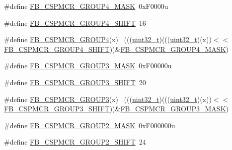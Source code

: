 \begin{DoxyCompactItemize}
\item 
\#define \hyperlink{group___f_b___register___masks_gaa24d34ff345a0131f93f71c38e20b7a5}{F\+B\+\_\+\+C\+S\+P\+M\+C\+R\+\_\+\+G\+R\+O\+U\+P4\+\_\+\+M\+A\+SK}~0x\+F0000u
\item 
\#define \hyperlink{group___f_b___register___masks_ga53fde1abc71ae9149418ea7fb6e53fba}{F\+B\+\_\+\+C\+S\+P\+M\+C\+R\+\_\+\+G\+R\+O\+U\+P4\+\_\+\+S\+H\+I\+FT}~16
\item 
\#define \hyperlink{group___f_b___register___masks_gab06572d35c1e04d27ba4eaebe576ac07}{F\+B\+\_\+\+C\+S\+P\+M\+C\+R\+\_\+\+G\+R\+O\+U\+P4}(x)                                        ~(((\hyperlink{_p_e___types_8h_a33594304e786b158f3fb30289278f5af}{uint32\+\_\+t})(((\hyperlink{_p_e___types_8h_a33594304e786b158f3fb30289278f5af}{uint32\+\_\+t})(x))$<$$<$\hyperlink{group___f_b___register___masks_ga53fde1abc71ae9149418ea7fb6e53fba}{F\+B\+\_\+\+C\+S\+P\+M\+C\+R\+\_\+\+G\+R\+O\+U\+P4\+\_\+\+S\+H\+I\+FT}))\&\hyperlink{group___f_b___register___masks_gaa24d34ff345a0131f93f71c38e20b7a5}{F\+B\+\_\+\+C\+S\+P\+M\+C\+R\+\_\+\+G\+R\+O\+U\+P4\+\_\+\+M\+A\+SK})
\item 
\#define \hyperlink{group___f_b___register___masks_gac53d0fcbc3464725ceda1d20147fe98c}{F\+B\+\_\+\+C\+S\+P\+M\+C\+R\+\_\+\+G\+R\+O\+U\+P3\+\_\+\+M\+A\+SK}~0x\+F00000u
\item 
\#define \hyperlink{group___f_b___register___masks_ga9f0b849b6cb1a2f629dcd23a0a0a4306}{F\+B\+\_\+\+C\+S\+P\+M\+C\+R\+\_\+\+G\+R\+O\+U\+P3\+\_\+\+S\+H\+I\+FT}~20
\item 
\#define \hyperlink{group___f_b___register___masks_gadf0a03bd6ac07968aaa35ad4f6fecfeb}{F\+B\+\_\+\+C\+S\+P\+M\+C\+R\+\_\+\+G\+R\+O\+U\+P3}(x)                                        ~(((\hyperlink{_p_e___types_8h_a33594304e786b158f3fb30289278f5af}{uint32\+\_\+t})(((\hyperlink{_p_e___types_8h_a33594304e786b158f3fb30289278f5af}{uint32\+\_\+t})(x))$<$$<$\hyperlink{group___f_b___register___masks_ga9f0b849b6cb1a2f629dcd23a0a0a4306}{F\+B\+\_\+\+C\+S\+P\+M\+C\+R\+\_\+\+G\+R\+O\+U\+P3\+\_\+\+S\+H\+I\+FT}))\&\hyperlink{group___f_b___register___masks_gac53d0fcbc3464725ceda1d20147fe98c}{F\+B\+\_\+\+C\+S\+P\+M\+C\+R\+\_\+\+G\+R\+O\+U\+P3\+\_\+\+M\+A\+SK})
\item 
\#define \hyperlink{group___f_b___register___masks_ga594596b281baba23e03cb37fbf0a05db}{F\+B\+\_\+\+C\+S\+P\+M\+C\+R\+\_\+\+G\+R\+O\+U\+P2\+\_\+\+M\+A\+SK}~0x\+F000000u
\item 
\#define \hyperlink{group___f_b___register___masks_ga332a2c4e7103b2f21af54da036518928}{F\+B\+\_\+\+C\+S\+P\+M\+C\+R\+\_\+\+G\+R\+O\+U\+P2\+\_\+\+S\+H\+I\+FT}~24

\end{DoxyCompactItemize}
